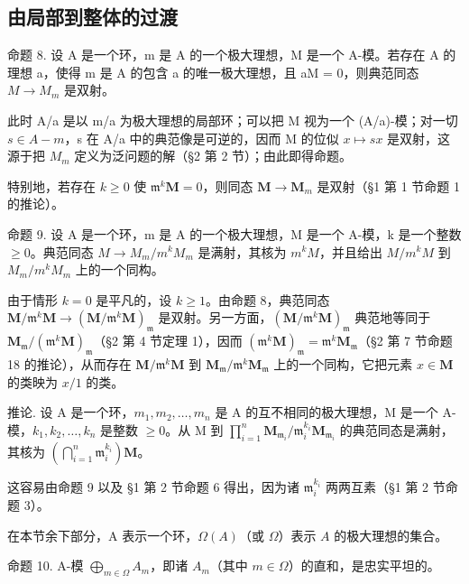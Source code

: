 \subsection{由局部到整体的过渡}

命题 8. 设 A 是一个环，m 是 A 的一个极大理想，M 是一个 A-模。若存在 A 的理想 a，使得 m 是 A 的包含 a 的唯一极大理想，且 aM = 0，则典范同态 \(M \rightarrow M_{m}\) 是双射。

此时 A/a 是以 m/a 为极大理想的局部环；可以把 M 视为一个 (A/a)-模；对一切 \(s \in A - m\)，s 在 A/a 中的典范像是可逆的，因而 M 的位似 \(x \mapsto sx\) 是双射，这源于把 \(M_{m}\) 定义为泛问题的解（§2 第 2 节）；由此即得命题。

特别地，若存在 \(k \geqslant 0\) 使 \(\mathfrak{m}^k\mathbf{M} = 0\)，则同态 \(\mathbf{M} \to \mathbf{M}_m\) 是双射（§1 第 1 节命题 1 的推论）。

命题 9. 设 A 是一个环，m 是 A 的一个极大理想，M 是一个 A-模，k 是一个整数 \(\geqslant0\)。典范同态 \(M\to M_{m}/m^{k}M_{m}\) 是满射，其核为 \(m^{k}M\)，并且给出 \(M/m^{k}M\) 到 \(M_{m}/m^{k}M_{m}\) 上的一个同构。

由于情形 \(k=0\) 是平凡的，设 \(k\geqslant1\)。由命题 8，典范同态 \(\mathbf{M}/\mathfrak{m}^{k}\mathbf{M}\to(\mathbf{M}/\mathfrak{m}^{k}\mathbf{M})_{\mathfrak{m}}\) 是双射。另一方面，\((\mathbf{M}/\mathfrak{m}^{k}\mathbf{M})_{\mathfrak{m}}\) 典范地等同于 \(\mathbf{M}_{\mathfrak{m}}/(\mathfrak{m}^{k}\mathbf{M})_{\mathfrak{m}}\)（§2 第 4 节定理 1），因而 \((\mathfrak{m}^{k}\mathbf{M})_{\mathfrak{m}}=\mathfrak{m}^{k}\mathbf{M}_{\mathfrak{m}}\)（§2 第 7 节命题 18 的推论），从而存在 \(\mathbf{M}/\mathfrak{m}^{k}\mathbf{M}\) 到 \(\mathbf{M}_{\mathfrak{m}}/\mathfrak{m}^{k}\mathbf{M}_{\mathfrak{m}}\) 上的一个同构，它把元素 \(x\in\mathbf{M}\) 的类映为 \(x/1\) 的类。

推论. 设 A 是一个环，\(m_{1}, m_{2}, \ldots, m_{n}\) 是 A 的互不相同的极大理想，M 是一个 A-模，\(k_{1}, k_{2}, \ldots, k_{n}\) 是整数 \(\geqslant 0\)。从 M 到 \(\prod_{i=1}^{n} \mathbf{M}_{\mathfrak{m}_{i}}/\mathfrak{m}_{i}^{k_{i}} \mathbf{M}_{\mathfrak{m}_{i}}\) 的典范同态是满射，其核为 \(\left(\bigcap_{i=1}^{n} \mathfrak{m}_{i}^{k_{i}}\right) \mathbf{M}\)。

这容易由命题 9 以及 §1 第 2 节命题 6 得出，因为诸 \(\mathfrak{m}_{i}^{k_{i}}\) 两两互素（§1 第 2 节命题 3）。

在本节余下部分，A 表示一个环，\(\Omega(A)\)（或 \(\Omega\)）表示 \(A\) 的极大理想的集合。

命题 10. A-模 \(\bigoplus_{m\in\Omega}A_m\)，即诸 \(A_m\)（其中 \(m\in\Omega\)）的直和，是忠实平坦的。

